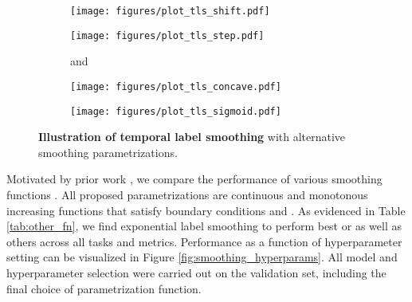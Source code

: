 \documentclass[nohyperref]{article}
\begin{document}
\begin{figure}[h]
\centering
\begin{subfigure}{0.49\textwidth}
  \centering
  \texttt{[image: figures/plot\_tls\_shift.pdf]}
  \caption{\centering {}} \label{fig:qshift}
\end{subfigure}
\hspace{2pt}
\begin{subfigure}{0.49\textwidth}
  \centering
  \texttt{[image: figures/plot\_tls\_step.pdf]}
  \caption{\centering  and }
  \label{fig:step_TLS}
\end{subfigure}
\vspace{0.5em}

\begin{subfigure}{0.49\textwidth}
  \centering
  \texttt{[image: figures/plot\_tls\_concave.pdf]}
  \caption{{\centering }} \label{fig:concave}
\end{subfigure}
\hspace{2pt}
\begin{subfigure}{0.49\textwidth}
  \centering
  \texttt{[image: figures/plot\_tls\_sigmoid.pdf]}
  \caption{\centering \centering }
  \label{fig:sigmoid_TLS}
\end{subfigure}
\caption{\textbf{Illustration of temporal label smoothing} with alternative smoothing parametrizations.} \label{fig:TLS_other}
\end{figure}

Motivated by prior work \citep{tomavsev2019, cox1972}, we compare the performance of various smoothing functions . All proposed parametrizations are continuous and monotonous increasing functions that satisfy boundary conditions  and . As evidenced in Table \ref{tab:other_fn}, we find exponential label smoothing to perform best or as well as others across all tasks and metrics. {Performance as a function of hyperparameter setting can be visualized in Figure \ref{fig:smoothing_hyperparams}. All model and hyperparameter selection were carried out on the validation set, including the final choice of parametrization function.
}
\end{document}
